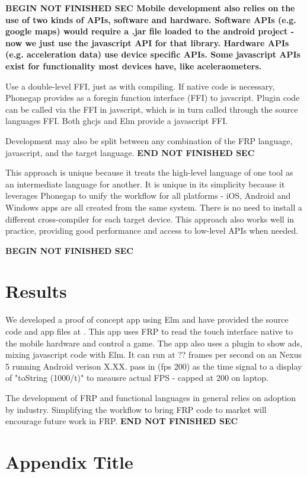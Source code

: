\documentclass{sigplanconf}
\begin{document}
\bf{BEGIN NOT FINISHED SEC}
Mobile development also relies on the use of two kinds of APIs, software and hardware.
Software APIs (e.g. google maps) would require a .jar file loaded to the android project - now we just use the javascript API for that library.
Hardware APIs (e.g. acceleration data) use device specific APIs.
Some javascript APIs exist for functionality most devices have, like aceleraometers.

Use a double-level FFI, just as with compiling.
If native code is necessary, Phonegap provides  as a foregin function interface (FFI) to javscript.
Plugin code can be called via the FFI in javscript, which is in turn called through the source languages FFI.
Both ghcjs and Elm provide a javascript FFI. 

Development may also be split between any combination of the FRP language, javascript, and the target language.
\bf{END NOT FINISHED SEC}

This approach is unique because it treats the high-level language of one tool as an intermediate language for another. 
It is unique in its simplicity because it leverages Phonegap to unify the workflow for all platforms - iOS, Android and Windows apps are all created from the same system.
There is no need to install a different cross-compiler for each target device.
This approach also works well in practice, providing good performance and access to low-level APIs when needed.


\bf{BEGIN NOT FINISHED SEC}
\section{Results}
We developed a proof of concept app using Elm and have provided the source code and app files at .
This app uses FRP to read the touch interface native to the mobile hardware and control a game.
The app also uses a plugin to show ads, mixing javascript code with Elm.
It can run at ?? frames per second on an Nexus 5 running Android verison X.XX.
pass in (fps 200) as the time signal to a display of "toString (1000/t)" to meausre actual FPS - capped at 200 on laptop. 
 
The development of FRP and functional languages in general relies on adoption by industry.
Simplifying the workflow to bring FRP code to market will encourage future work in FRP.
\bf{END NOT FINISHED SEC}

\appendix
\section{Appendix Title}
\end{document}
